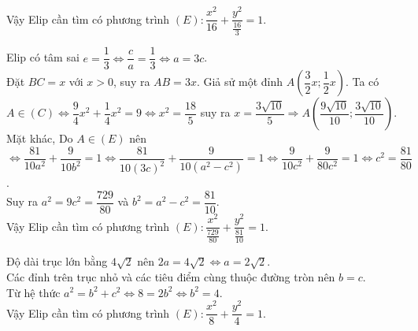 \begin{bt}
{\begin{listEX}
		Vậy Elip cần tìm có phương trình $(E)\colon \dfrac{x^2}{16}+\dfrac{y^2}{\frac{16}{3}}=1$.
		\item Elip có tâm sai $e=\dfrac{1}{3} \Leftrightarrow \dfrac{c}{a}=\dfrac{1}{3} \Leftrightarrow a=3c$.\\
		Đặt $BC=x$ với $x>0$, suy ra $AB=3x$. Giả sử một đỉnh $A\left(\dfrac{3}{2}x;\dfrac{1}{2}x\right)$. Ta có\\
		$A\in (C) \Leftrightarrow \dfrac{9}{4}x^2+\dfrac{1}{4}x^2=9 \Leftrightarrow x^2=\dfrac{18}{5}$ suy ra $x=\dfrac{3\sqrt{10}}{5} \Rightarrow A\left(\dfrac{9\sqrt{10}}{10};\dfrac{3\sqrt{10}}{10}\right)$.\\
		Mặt khác, Do $A\in (E)$ nên \\
		$ \Leftrightarrow \dfrac{81}{10a^2}+\dfrac{9}{10b^2}=1 \Leftrightarrow \dfrac{81}{10(3c)^2}+\dfrac{9}{10(a^2-c^2)}=1 \Leftrightarrow \dfrac{9}{10c^2}+\dfrac{9}{80c^2}=1 \Leftrightarrow c^2=\dfrac{81}{80}$.\\
		Suy ra $a^2=9c^2=\dfrac{729}{80}$ và $b^2=a^2-c^2=\dfrac{81}{10}$.\\
		Vậy Elip cần tìm có phương trình $(E)\colon \dfrac{x^2}{\frac{729}{80}}+\dfrac{y^2}{\frac{81}{10}}=1$.\\
		\item Độ dài trục lớn bằng $4\sqrt{2}$ nên $2a=4\sqrt{2} \Leftrightarrow a=2\sqrt{2}$.\\
		Các đỉnh trên trục nhỏ và các tiêu điểm cùng thuộc đường tròn nên $b=c$.\\
		Từ hệ thức $a^2=b^2+c^2 \Leftrightarrow 8=2b^2 \Leftrightarrow b^2=4$.\\
		Vậy Elip cần tìm có phương trình $(E)\colon \dfrac{x^2}{8}+\dfrac{y^2}{4}=1$.
	\end{listEX}
}
\end{bt}

